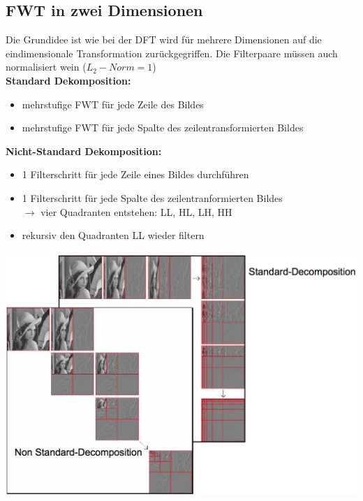 \documentclass[10pt]{article}
\begin{document}
\subsection{FWT in zwei Dimensionen}
Die Grundidee ist wie bei der DFT wird für mehrere Dimensionen auf die eindimensionale Transformation zurückgegriffen. Die Filterpaare müssen auch normalisiert wein ($L_2-Norm = 1$) \\
\textbf{Standard Dekomposition:}
\begin{itemize}
	\item mehrstufige FWT für jede Zeile des Bildes
	\item mehrstufige FWT für jede Spalte des zeilentransformierten Bildes
\end{itemize}
\textbf{Nicht-Standard Dekomposition:}
\begin{itemize}
	\item 1 Filterschritt für jede Zeile eines Bildes durchführen
	\item 1 Filterschritt für jede Spalte des zeilentranformierten Bildes \\
		$\rightarrow$ vier Quadranten entstehen: LL, HL, LH, HH
	\item rekursiv den Quadranten LL wieder filtern
\end{itemize}
\begin{center}
	\includegraphics[scale=0.15]{2d-fwt-dekompositionen.png}
\end{center}
\end{document}
